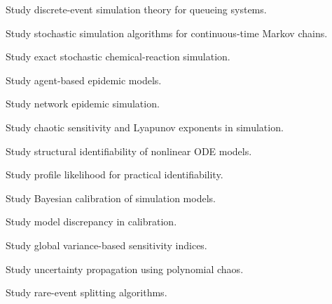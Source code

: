\begin{exercise}[4]
Study discrete-event simulation theory for queueing systems.
\end{exercise}

\begin{exercise}[4]
Study stochastic simulation algorithms for continuous-time Markov chains.
\end{exercise}

\begin{exercise}[4]
Study exact stochastic chemical-reaction simulation.
\end{exercise}

\begin{exercise}[4]
Study agent-based epidemic models.
\end{exercise}

\begin{exercise}[4]
Study network epidemic simulation.
\end{exercise}

\begin{exercise}[4]
Study chaotic sensitivity and Lyapunov exponents in simulation.
\end{exercise}

\begin{exercise}[4]
Study structural identifiability of nonlinear ODE models.
\end{exercise}

\begin{exercise}[4]
Study profile likelihood for practical identifiability.
\end{exercise}

\begin{exercise}[4]
Study Bayesian calibration of simulation models.
\end{exercise}

\begin{exercise}[4]
Study model discrepancy in calibration.
\end{exercise}

\begin{exercise}[4]
Study global variance-based sensitivity indices.
\end{exercise}

\begin{exercise}[4]
Study uncertainty propagation using polynomial chaos.
\end{exercise}

\begin{exercise}[4]
Study rare-event splitting algorithms.
\end{exercise}

